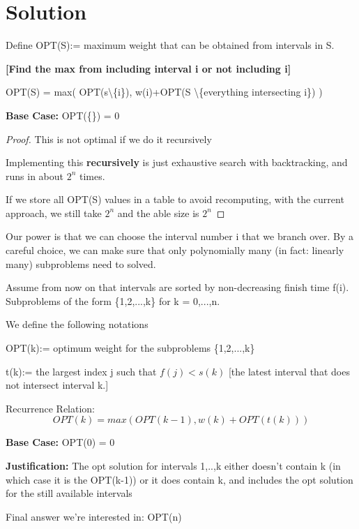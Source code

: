 \documentclass[openany]{article}
\begin{document}
\section*{Solution}
\begin{solution*}{}
    Define OPT(S):= maximum weight that can be obtained from intervals in S.

    \begin{center}
            \textbf{[Find the max from including interval i or not including i]}
    \end{center}
    
    OPT(S) = max( OPT(s\textbackslash \{i\}), w(i)+OPT(S \textbackslash \{everything intersecting i\}) )

    \textbf{Base Case:} OPT(\{\}) = 0

    \begin{proof}{This is not optimal if we do it recursively}
    
        Implementing this \textbf{recursively} is just exhaustive search with backtracking, and runs in about $2^n$ times.

        If we store all OPT(S) values in a table to avoid recomputing, with the current approach, we still take $2^n$ and the able size is $2^n$
    \end{proof}

    Our power is that we can choose the interval number i that we branch over. By a careful choice, we can make sure that only polynomially many (in fact: linearly many) subproblems need to solved.

    Assume from now on that intervals are sorted by non-decreasing finish time f(i). Subproblems of the form \{1,2,...,k\} for k = 0,...,n.

    We define the following notations
    
    OPT(k):= optimum weight for the subproblems \{1,2,...,k\}
    
    t(k):= the largest index j such that $f(j) < s(k)$ [the latest interval that does not intersect interval k.]
    
    Recurrence Relation:
    \[OPT(k) = max(OPT(k-1), w(k)+OPT(t(k)))\]

    \textbf{Base Case:} OPT(0) = 0
    
    \textbf{Justification:} The opt solution for intervals 1,..,k either doesn't contain k (in which case it is the OPT(k-1)) or it does contain k, and includes the opt solution for the still available intervals

    Final answer we're interested in: OPT(n)


\end{solution*}
\end{document}
